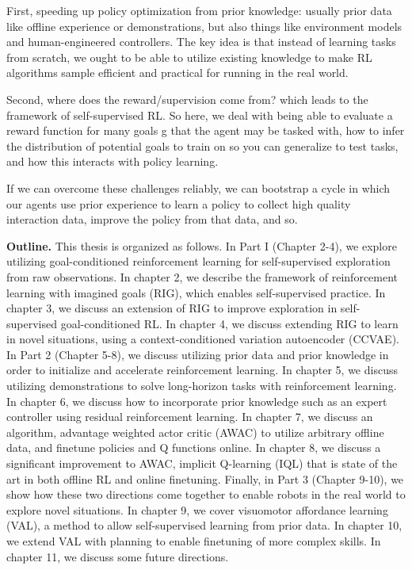 First, speeding up policy optimization from prior knowledge: usually prior data like offline experience or demonstrations, but also things like environment models and human-engineered controllers. The key idea is that instead of learning tasks from scratch, we ought to be able to utilize existing knowledge to make RL algorithms sample efficient and practical for running in the real world.

Second, where does the reward/supervision come from? which leads to the framework of self-supervised RL. So here, we deal with being able to evaluate a reward function for many goals g that the agent may be tasked with, how to infer the distribution of potential goals to train on so you can generalize to test tasks, and how this interacts with policy learning.

If we can overcome these challenges reliably, we can bootstrap a cycle in which our agents use prior experience to learn a policy to collect high quality interaction data, improve the policy from that data, and so.

\vspace{5mm}

\textbf{Outline.} This thesis is organized as follows. In Part I (Chapter 2-4), we explore utilizing goal-conditioned reinforcement learning for self-supervised exploration from raw observations. In chapter 2, we describe the framework of reinforcement learning with imagined goals (RIG), which enables self-supervised practice. In chapter 3, we discuss an extension of RIG to improve exploration in self-supervised goal-conditioned RL. In chapter 4, we discuss extending RIG to learn in novel situations, using a context-conditioned variation autoencoder (CCVAE). In Part 2 (Chapter 5-8), we discuss utilizing prior data and prior knowledge in order to initialize and accelerate reinforcement learning. In chapter 5, we discuss utilizing demonstrations to solve long-horizon tasks with reinforcement learning. In chapter 6, we discuss how to incorporate prior knowledge such as an expert controller using residual reinforcement learning. In chapter 7, we discuss an algorithm, advantage weighted actor critic (AWAC) to utilize arbitrary offline data, and finetune policies and Q functions online. In chapter 8, we discuss a significant improvement to AWAC, implicit Q-learning (IQL) that is state of the art in both offline RL and online finetuning. Finally, in Part 3 (Chapter 9-10), we show how these two directions come together to enable robots in the real world to explore novel situations. In chapter 9, we cover visuomotor affordance learning (VAL), a method to allow self-supervised learning from prior data. In chapter 10, we extend VAL with planning to enable finetuning of more complex skills. In chapter 11, we discuss some future directions.



